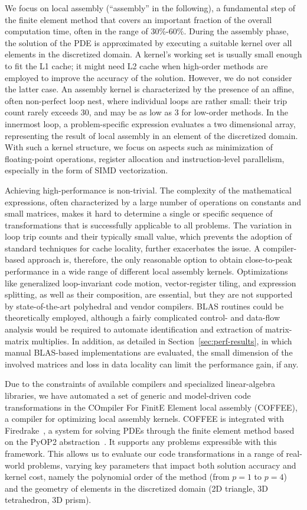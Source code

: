 \documentclass[conference]{IEEEtran}
\begin{document}
We focus on local assembly (``assembly'' in the following), a fundamental step of the finite element method that covers an important fraction of the overall computation time, often in the range of 30$\%$-60$\%$. During the assembly phase, the solution of the PDE is approximated by executing a suitable kernel over all elements in the discretized domain. A kernel's working set is usually small enough to fit the L1 cache; it might need L2 cache when high-order methods are employed to improve the accuracy of the solution. However, we do not consider the latter case. An assembly kernel is characterized by the presence of an affine, often non-perfect loop nest, where individual loops are rather small: their trip count rarely exceeds 30, and may be as low as 3 for low-order methods. In the innermost loop, a problem-specific expression evaluates a two dimensional array, representing the result of local assembly in an element of the discretized domain. With such a kernel structure, we focus on aspects such as minimization of floating-point operations, register allocation and instruction-level parallelism, especially in the form of SIMD vectorization.

Achieving high-performance is non-trivial. The complexity of the mathematical expressions, often characterized by a large number of operations on constants and small matrices, makes it hard to determine a single or specific sequence of transformations that is successfully applicable to all problems. The variation in loop trip counts and their typically small value, which prevents the adoption of standard techniques for cache locality, further exacerbates the issue. A compiler-based approach is, therefore, the only reasonable option to obtain close-to-peak performance in a wide range of different local assembly kernels. Optimizations like generalized loop-invariant code motion, vector-register tiling, and expression splitting, as well as their composition, are essential, but they are not supported by state-of-the-art polyhedral and vendor compilers. BLAS routines could be theoretically employed, although a fairly complicated control- and data-flow analysis would be required to automate identification and extraction of matrix-matrix multiplies. In addition, as detailed in Section~\ref{sec:perf-results}, in which manual BLAS-based implementations are evaluated, the small dimension of the involved matrices and loss in data locality can limit the performance gain, if any.

Due to the constraints of available compilers and specialized linear-algebra libraries, we have automated a set of generic and model-driven code transformations in the COmpiler For FinitE Element local assembly (COFFEE), a compiler for optimizing local assembly kernels. COFFEE is integrated with Firedrake~\cite{firedrake-code}, a system for solving PDEs through the finite element method based on the PyOP2 abstraction~\cite{pyop2isc,pyop2ws}. It supports any problems expressible with this framework. This allows us to evaluate our code transformations in a range of real-world problems, varying key parameters that impact both solution accuracy and kernel cost, namely the polynomial order of the method (from $p=1$ to $p=4$) and the geometry of elements in the discretized domain (2D triangle, 3D tetrahedron, 3D prism).
\end{document}
